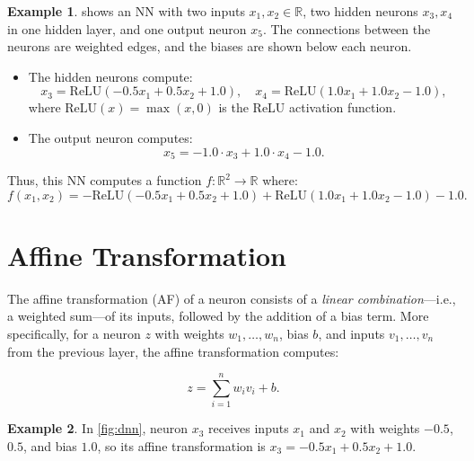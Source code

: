 \documentclass[oneside,11pt,dvipsnames]{book}
\numberwithin{equation}{section}
\theoremstyle{definition}
\newtheorem{example}{Example}[section]
\theoremstyle{remark}
\newcommand{\relu}[1]{\mathrm{ReLU}\left(#1\right)}
\begin{document}
\begin{example}\label{ex:dnn}
 shows an NN with two inputs $x_1, x_2 \in \mathbb{R}$, two hidden neurons \(x_3, x_4\) in one hidden layer, and one output neuron \(x_5\). The connections between the neurons are weighted edges, and the biases are shown below each neuron.


\begin{itemize}
    \item The hidden neurons compute:
    \[
    x_3 = \relu{-0.5 x_1 + 0.5 x_2 + 1.0},\quad x_4 = \relu{1.0 x_1 + 1.0 x_2 - 1.0},
    \]
    where $\relu{x} = \max(x, 0)$ is the ReLU activation function.
    \item The output neuron computes:
    \[
    x_5 = -1.0 \cdot x_3 + 1.0 \cdot x_4 - 1.0.
    \]
\end{itemize}

Thus, this NN computes a function \(f: \mathbb{R}^2 \to \mathbb{R}\) where:
\[
f(x_1, x_2) = -\relu{-0.5 x_1 + 0.5 x_2 + 1.0} + \relu{1.0 x_1 + 1.0 x_2 - 1.0} - 1.0.
\]
\end{example}



\section{Affine Transformation}\label{sec:affine}

The affine transformation (AF) of a neuron consists of a \emph{linear combination}---i.e., a weighted sum---of its inputs, followed by the addition of a bias term. More specifically, for a neuron $z$ with weights \(w_1, \dots, w_n\), bias \(b\), and inputs \(v_1, \dots, v_n\) from the previous layer, the affine transformation computes:

\begin{equation}\label{eq:affine}   
    z = \sum_{i=1}^{n} w_i v_i + b.
\end{equation}


\begin{example}
In \autoref{fig:dnn}, neuron \(x_3\) receives inputs \(x_1\) and \(x_2\) with weights \(-0.5\), \(0.5\), and bias \(1.0\), so its affine transformation is $x_3 = -0.5 x_1 + 0.5 x_2 + 1.0$.
\end{example}
\end{document}
